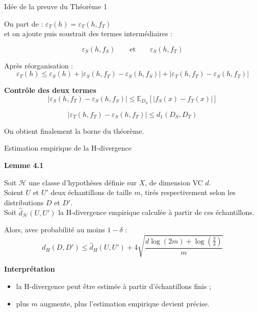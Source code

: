 \documentclass[11pt]{beamer}
\begin{document}
\begin{frame}{Idée de la preuve du Théorème 1}

On part de : $
\varepsilon_T(h)=\varepsilon_T(h,f_T)$ \\

et on ajoute puis soustrait des termes intermédiaires :

\[
\varepsilon_S(h,f_S)
\qquad \text{et} \qquad
\varepsilon_S(h,f_T)
\]

\vspace{0.1cm}

Après réorganisation :
\[
\varepsilon_T(h)
\leq
\varepsilon_S(h)
+
|\varepsilon_S(h,f_T)-\varepsilon_S(h,f_S)|
+
|\varepsilon_T(h,f_T)-\varepsilon_S(h,f_T)|
\]

\vspace{0.1cm}

\textbf{Contrôle des deux termes}
\[
|\varepsilon_S(h,f_T)-\varepsilon_S(h,f_S)|
\leq
\mathbb{E}_{D_S}[|f_S(x)-f_T(x)|]
\]

\[
|\varepsilon_T(h,f_T)-\varepsilon_S(h,f_T)|
\leq
d_1(D_S,D_T)
\]
\vspace{0.1cm}

On obtient finalement la borne du théorème.

\end{frame}



\begin{frame}{Estimation empirique de la H-divergence}

\textbf{Lemme 4.1}

\vspace{0.1cm}
Soit $\mathcal{H}$ une classe d’hypothèses définie sur $X$, de dimension VC $d$. \\
Soient $U$ et $U'$ deux échantillons de taille $m$, tirés respectivement selon les distributions $D$ et $D'$. \\
Soit $\hat{d}_{\mathcal{H}}(U, U')$ la H-divergence empirique calculée à partir de ces échantillons.

\vspace{0.2cm}

Alors, avec probabilité au moins $1-\delta$ :
\[
d_H(D,D')
\leq
\hat d_H(U,U')
+
4
\sqrt{
\frac{
d\log(2m)+\log\left(\frac{2}{\delta}\right)
}{m}
}
\]

\vspace{0.2cm}

\textbf{Interprétation}

\begin{itemize}
    \item la H-divergence peut être estimée à partir d’échantillons finis ;
    
    \item plus $m$ augmente,
    plus l’estimation empirique devient précise.
\end{itemize}

\end{frame}
\end{document}
